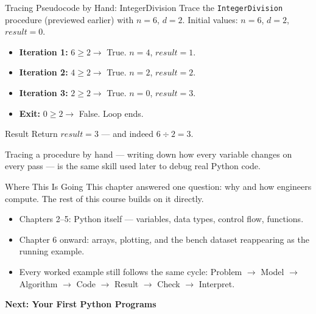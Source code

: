 \documentclass[9pt,aspectratio=169,xcolor=table]{beamer}
\begin{document}
\begin{frame}{Tracing Pseudocode by Hand: IntegerDivision}
    \leavevmode
    \small
    Trace the \texttt{IntegerDivision} procedure (previewed earlier) with
    $n = 6$, $d = 2$. Initial values: $n=6$, $d=2$, $\mathit{result}=0$.

    \vspace{2mm}
    \begin{itemize}\itemsep2pt
        \item \textbf{Iteration 1:} $6 \geq 2 \to$ True. $n=4$, $\mathit{result}=1$.
        \item \textbf{Iteration 2:} $4 \geq 2 \to$ True. $n=2$, $\mathit{result}=2$.
        \item \textbf{Iteration 3:} $2 \geq 2 \to$ True. $n=0$, $\mathit{result}=3$.
        \item \textbf{Exit:} $0 \geq 2 \to$ False. Loop ends.
    \end{itemize}

    \vspace{2mm}
    \begin{block}{Result}
        Return $\mathit{result} = 3$ --- and indeed $6 \div 2 = 3$.
    \end{block}

    \vspace{2mm}
    {\scriptsize Tracing a procedure by hand --- writing down how every
    variable changes on every pass --- is the same skill used later to
    debug real Python code.}
\end{frame}

\begin{frame}{Where This Is Going}
    \leavevmode
    \small
    This chapter answered one question: \alert{why} and \alert{how}
    engineers compute. The rest of this course builds on it directly.

    \vspace{3mm}
    \begin{itemize}
        \item Chapters 2--5: Python itself --- variables, data types,
              control flow, functions.
        \item Chapter 6 onward: arrays, plotting, and the bench dataset
              reappearing as the running example.
        \item Every worked example still follows the same cycle:
              \alert{Problem $\to$ Model $\to$ Algorithm $\to$ Code
              $\to$ Result $\to$ Check $\to$ Interpret}.
    \end{itemize}

    \vspace{4mm}
    \begin{center}
        \large\color{primary}\textbf{Next: Your First Python Programs}
    \end{center}
\end{frame}
\end{document}

